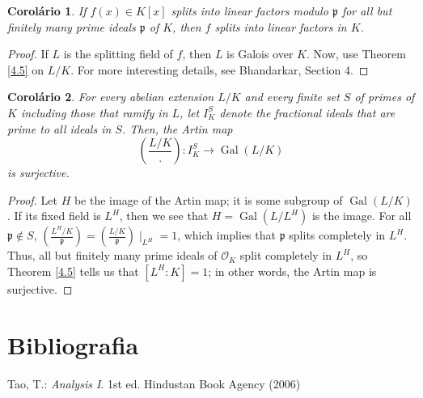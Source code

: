 \documentclass{article}
\DeclareMathOperator{\Gal}{Gal}
\theoremstyle{plain}
\newtheorem{cor}{Corolário}
\theoremstyle{remark}
\numberwithin{equation}{section}
\numberwithin{thm}{section}
\numberwithin{defn}{section}
\numberwithin{lemma}{section}
\numberwithin{axm}{section}
\begin{document}
\begin{cor}
If $f(x) \in K[x]$ splits into linear factors modulo $\mathfrak{p}$ for all but finitely many prime ideals $\mathfrak{p}$ of $K$, then $f$ splits into linear factors in $K$.
\end{cor}

\begin{proof}
If $L$ is the splitting field of $f$, then $L$ is Galois over $K$. Now, use Theorem \ref{4.5} on $L/K$. For more interesting details, see Bhandarkar\cite{bhandarkar2018hilbert}, Section 4. 
\end{proof}

\begin{cor}
For every abelian extension $L/K$ and every finite set $S$ of primes of $K$ including those that ramify in $L$, let $I_{K}^{S}$ denote the fractional ideals that are prime to all ideals in $S$. Then, the Artin map $$\left(\frac{L/K}{.}\right) : I_{K}^{S} \longrightarrow \Gal(L/K)$$ is surjective. 
\end{cor}

\begin{proof}
Let $H$ be the image of the Artin map; it is some subgroup of $\Gal(L/K)$. If its fixed field is $L^{H}$, then we see that $H = \Gal(L/L^{H})$ is the image. For all $\mathfrak{p} \not\in S$, $\left(\frac{L^{H}/K}{\mathfrak{p}}\right) = \left(\frac{L/K}{\mathfrak{p}}\right) \mid_{L^{H}} = 1$, which implies that $\mathfrak{p}$ splits completely in $L^{H}$. Thus, all but finitely many prime ideals of $\mathcal{O}_K$ split completely in $L^{H}$, so Theorem \ref{4.5} tells us that $[L^{H} : K] = 1$; in other words, the Artin map is surjective. 
\end{proof}


\section*{Bibliografia}
\begin{thebibliography}{1}

Tao, T.: \textit{Analysis I}. 1st ed. Hindustan Book Agency (2006)
\end{thebibliography}
\end{document}
